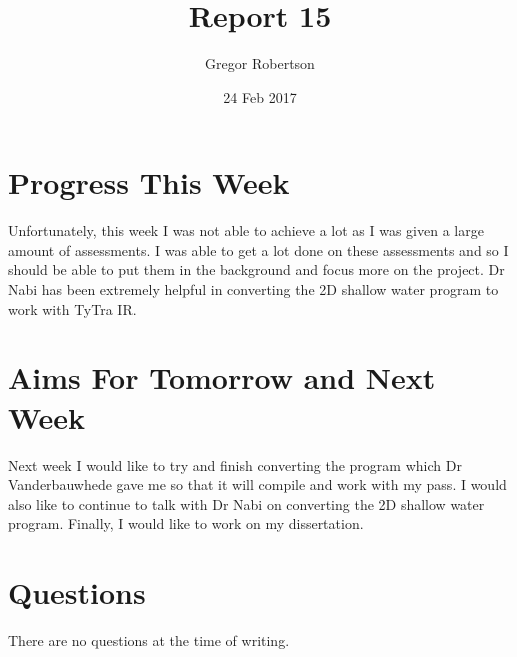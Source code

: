 \documentclass{article}
\title{Report 15}
\author{Gregor Robertson}
\date{24 Feb 2017}
\begin{document}
 
\maketitle
 
\section*{Progress This Week}
Unfortunately, this week I was not able to achieve a lot as I was given a large amount of assessments. I was able to get a lot done on these assessments and so I should be able to put them in the background and focus more on the project. Dr Nabi has been extremely helpful in converting the 2D shallow water program to work with TyTra IR. 

\section*{Aims For Tomorrow and Next Week}
Next week I would like to try and finish converting the program which Dr Vanderbauwhede gave me so that it will compile and work with my pass. I would also like to continue to talk with Dr Nabi on converting the 2D shallow water program. Finally, I would like to work on my dissertation. 

\section*{Questions}
There are no questions at the time of writing.
\medskip
 
\printbibliography
\end{document}
